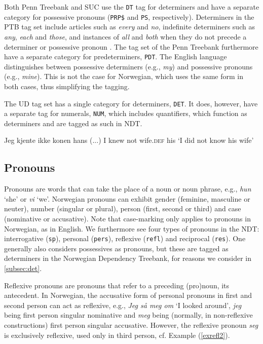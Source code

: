 \documentclass[a4paper,12pt,english]{book}
\begin{document}
Both Penn Treebank and SUC use the \texttt{DT} tag for determiners and
have a separate category for possessive pronouns (\texttt{PRP\$} and \texttt{PS},
respectively). Determiners in the PTB tag set include articles such as
\emph{every} and \emph{no}, indefinite determiners such as \emph{any},
\emph{each} and \emph{those}, and instances of \emph{all} and \emph{both} when
they do not precede a determiner or possessive pronoun \cite{San:90}.  The tag
set of the Penn Treebank furthermore have a separate category for
predeterminers, \texttt{PDT}. The English language distinguishes between
possessive determiners (e.g., \emph{my}) and possessive pronouns (e.g.,
\emph{mine}). This is not the case for Norwegian, which uses the same form in
both cases, thus simplifying the tagging.

The UD tag set has a single category for determiners, \texttt{DET}. It
does, however, have a separate tag for numerals, \texttt{NUM}, which includes
quantifiers, which function as determiners and are tagged as such in NDT.

\begin{examples}
\item \gll Jeg kjente ikke konen hans (...)
    I knew not wife.\textsc{def} his
    \glt `I did not know his wife'
    \glend
    \label{exdet}
\end{examples}

\subsection{Pronouns}
\label{subsec:pron}
Pronouns are words that can take the place of a noun or noun phrase, e.g.,
\emph{hun} `she' or \emph{vi} `we'. Norwegian pronouns can exhibit gender
(feminine, masculine or neuter), number (singular or plural), person (first,
second or third) and case (nominative or accusative). Note that case-marking
only applies to pronouns in Norwegian, as in English. We furthermore see four
types of pronouns in the NDT: interrogative (\texttt{sp}), personal
(\texttt{pers}), reflexive (\texttt{refl}) and reciprocal (\texttt{res}).
One generally also considers possessives as pronouns, but these are tagged as
determiners in the Norwegian Dependency Treebank, for reasons we consider in
\ref{subsec:det}.

Reflexive pronouns are pronouns that refer to a preceding (pro)noun, its
antecedent. In Norwegian, the accusative form of personal pronouns in first and
second person can act as reflexive, e.g., \emph{Jeg så meg om} `I looked
around', \emph{jeg} being first person singular nominative and \emph{meg} being
(normally, in non-reflexive constructions) first person singular accusative.
However, the reflexive pronoun \emph{seg} is exclusively reflexive, used only
in third person, cf. Example (\ref{exrefl2}).
\end{document}
